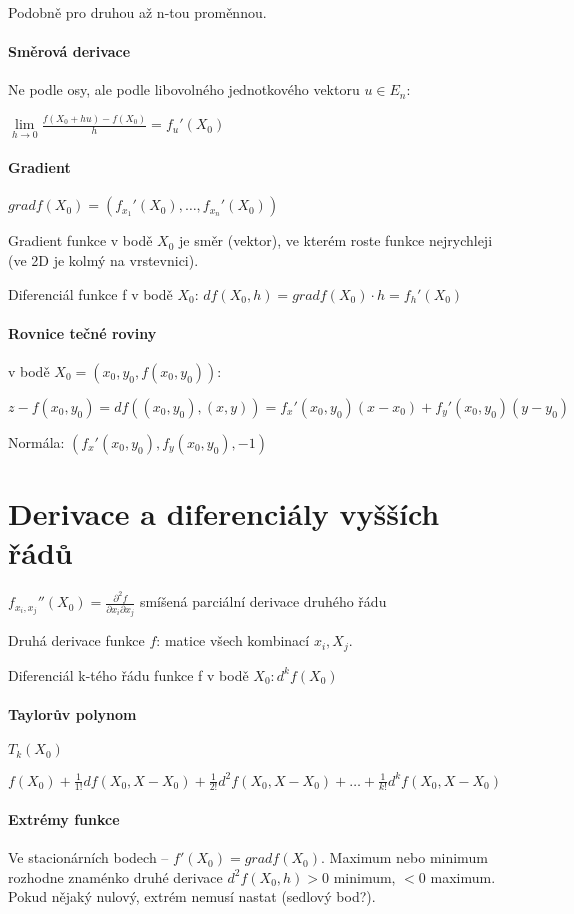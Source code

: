 \documentclass[a4paper, 11pt]{report}
\begin{document}
Podobně pro druhou až n-tou proměnnou.

\paragraph{Směrová derivace} Ne podle osy, ale podle libovolného jednotkového vektoru $u \in E_n$:

$\lim\limits_{h \to 0} \frac{f(X_0 + h u) - f(X_0)}{h} = f_u'(X_0)$

\paragraph{Gradient} $grad f(X_0) = (f_{x_1}'(X_0), \dots, f_{x_n}'(X_0) )$

Gradient funkce v bodě $X_0$ je směr (vektor), ve kterém roste funkce nejrychleji (ve 2D je kolmý na vrstevnici).

Diferenciál funkce f v bodě $X_0$: $df(X_0, h) = gradf(X_0) \cdot h = f_h'(X_0)$

\paragraph{Rovnice tečné roviny} v bodě $X_0 = (x_0, y_0, f(x_0,y_0))$:

$z-f(x_0, y_0) = df((x_0, y_0), (x,y)) = f_x'(x_0, y_0)(x-x_0) + f_y'(x_0, y_0)(y-y_0)$ 

Normála: $(f_x'(x_0, y_0), f_y(x_0, y_0), -1)$

\section{Derivace a diferenciály vyšších řádů}

$f_{x_i, x_j}''(X_0) = \frac{\partial^2f}{\partial x_i \partial x_j}$ smíšená parciální derivace druhého řádu

Druhá derivace funkce $f$: matice všech kombinací $x_i, X_j$.

Diferenciál k-tého řádu funkce f v bodě $X_0: d^k f(X_0)$

\paragraph{Taylorův polynom} $T_k(X_0)$

$f(X_0) + \frac{1}{1!}df(X_0, X - X_0) + \frac{1}{2!}d^2f(X_0, X - X_0) + \dots + \frac{1}{k!}d^kf(X_0, X - X_0)$

\paragraph{Extrémy funkce} Ve stacionárních bodech -- $f'(X_0) = grad  f(X_0)$. Maximum nebo minimum rozhodne znaménko druhé derivace $d^2f(X_0,h) > 0$ minimum, $< 0$ maximum. Pokud nějaký nulový, extrém nemusí nastat (sedlový bod?).
\end{document}
